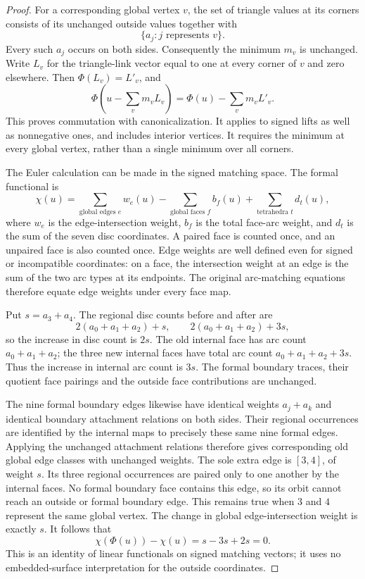 \begin{proof}
For a corresponding global vertex $v$, the set of triangle values at its
corners consists of its unchanged outside values together with
\[
                  \{a_j:j\text{ represents }v\}.
\]
Every such $a_j$ occurs on both sides.  Consequently the minimum $m_v$
is unchanged.  Write $L_v$ for the triangle-link vector equal to one at
every corner of $v$ and zero elsewhere.  Then $\Phi(L_v)=L'_v$, and
\[
 \Phi\left(u-\sum_v m_v L_v\right)
       =\Phi(u)-\sum_v m_v L'_v.
\]
This proves commutation with canonicalization.  It applies to signed
lifts as well as nonnegative ones, and includes interior vertices.
It requires the minimum at every global vertex, rather than a single
minimum over all corners.

The Euler calculation can be made in the signed matching space.  The
formal functional is
\[
 \chi(u)=\sum_{\text{global edges }e} w_e(u)
       -\sum_{\text{global faces }f} b_f(u)
       +\sum_{\text{tetrahedra }t} d_t(u),
\]
where $w_e$ is the edge-intersection weight, $b_f$ is the total face-arc
weight, and $d_t$ is the sum of the seven disc coordinates.  A paired face
is counted once, and an unpaired face is also counted once.  Edge weights
are well defined even for signed or incompatible coordinates: on a face,
the intersection weight at an edge is the sum of the two arc types at
its endpoints.  The original arc-matching equations therefore equate
edge weights under every face map.

Put $s=a_3+a_4$.  The regional disc counts before and after are
\[
 2(a_0+a_1+a_2)+s,\qquad 2(a_0+a_1+a_2)+3s,
\]
so the increase in disc count is $2s$.  The old internal face has arc
count $a_0+a_1+a_2$; the three new internal faces have total arc count
$a_0+a_1+a_2+3s$.  Thus the increase in internal arc count is $3s$.
The formal boundary traces, their quotient face pairings and the outside
face contributions are unchanged.

The nine formal boundary edges likewise have identical weights
$a_j+a_k$ and identical boundary attachment relations on both sides.
Their regional occurrences are identified by the internal maps to
precisely these same nine formal edges.  Applying the unchanged attachment
relations therefore gives corresponding old global edge classes with
unchanged weights.  The sole extra edge is $[3,4]$, of weight $s$.
Its three regional occurrences are paired only to one another by the
internal faces.  No formal boundary face contains this edge, so its
orbit cannot reach an outside or formal boundary edge.  This remains
true when $3$ and $4$ represent the same global vertex.  The change in
global edge-intersection weight is exactly $s$.  It follows that
\[
                   \chi(\Phi(u))-\chi(u)=s-3s+2s=0.
\]
This is an identity of linear functionals on signed matching vectors;
it uses no embedded-surface interpretation for the outside coordinates.


\end{proof}
